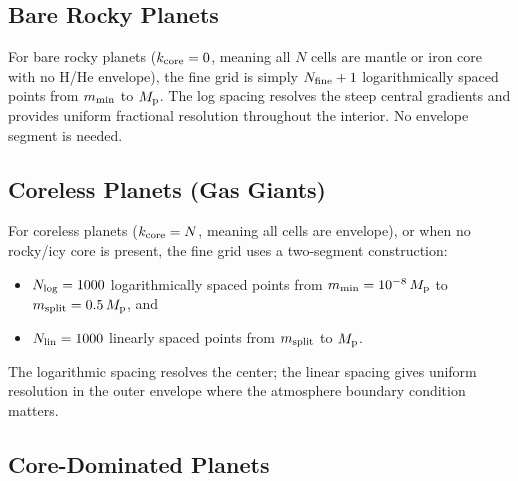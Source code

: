 \documentclass{aastex631}
\newcommand{\Mpl}{M_{\rm p}}
\begin{document}
\subsection{Bare Rocky Planets}\label{sec:grid_bare}

For bare rocky planets ($k_{\rm core} = 0$, meaning all $N$ cells are
mantle or iron core with no H/He envelope), the fine grid is simply
$N_{\rm fine} + 1$ logarithmically spaced points from $m_{\rm min}$ to
$\Mpl$.  The log spacing resolves the steep central gradients and
provides uniform fractional resolution throughout the interior.  No
envelope segment is needed.

\subsection{Coreless Planets (Gas Giants)}\label{sec:grid_gasgiant}

For coreless planets ($k_{\rm core} = N$, meaning all cells are
envelope), or when no rocky/icy core is present, the fine grid uses a
two-segment construction:
\begin{itemize}
  \item $N_{\rm log} = 1000$ logarithmically spaced points from
    $m_{\rm min} = 10^{-8}\,\Mpl$ to $m_{\rm split} = 0.5\,\Mpl$, and
  \item $N_{\rm lin} = 1000$ linearly spaced points from $m_{\rm split}$
    to $\Mpl$.
\end{itemize}
The logarithmic spacing resolves the center; the linear spacing gives
uniform resolution in the outer envelope where the atmosphere boundary
condition matters.

\subsection{Core-Dominated Planets}\label{sec:grid_rocky}
\end{document}

